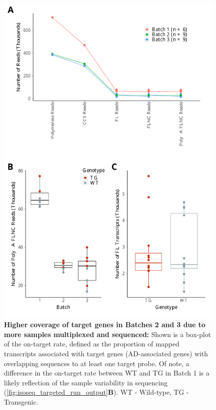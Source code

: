 \begin{figure}[!htp]
	\centering
		\includegraphics[page=2,trim={0 25cm 0 0},clip,scale = 0.55]{Figures/TargetedTranscriptome.pdf}
	\captionsetup{width=0.95\textwidth}
	\caption[On-Target rate of Iso-Seq targeted transcriptome profiling]%
	{\textbf{Higher coverage of target genes in Batches 2 and 3 due to more samples multiplexed and sequenced:} Shown is a box-plot of the on-target rate, defined as the proportion of mapped transcripts associated with target genes (AD-associated genes) with overlapping sequences to at least one target probe. Of note, a difference in the on-target rate between WT and TG in Batch 1 is a likely reflection of the sample variability in sequencing (\cref{fig:isoseq_targeted_run_output}\textbf{B}). WT - Wild-type, TG - Transgenic.}
	\label{fig:isoseq_targeted_rate}
\end{figure}

